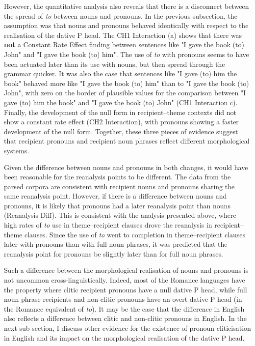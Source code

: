   However, the quantitative analysis also reveals that there is a disconnect between the spread of \textit{to} between nouns and pronouns. In the previous subsection, the assumption was that nouns and pronouns behaved identically with respect to the realisation of the dative P head. The CH1 Interaction (a) shows that there was \textbf{not} a Constant Rate Effect finding between sentences like "I gave the book (to) John" and "I gave the book (to) him". The use of \textit{to} with pronouns seems to have been actuated later than its use with nouns, but then spread through the grammar quicker. It was also the case that sentences like "I gave (to) him the book" behaved more like "I gave the book (to) him" than to "I gave the book (to) John", with zero on the border of plausible values for the comparison between "I gave (to) him the book" and "I gave the book (to) John" (CH1 Interaction c). Finally, the development of the null form in recipient--theme contexts did not show a constant rate effect (CH2 Interaction), with pronouns showing a faster development of the null form. Together, these three pieces of evidence suggest that recipient pronouns and recipient noun phrases reflect different morphological systems.

   Given the difference between nouns and pronouns in both changes, it would have been reasonable for the reanalysis points to be different. The data from the parsed corpora are consistent with recipient nouns and pronouns sharing the same reanalysis point. However, if there is a difference between nouns and pronouns, it is likely that pronouns had a later reanalysis point than nouns (Reanalysis Diff). This is consistent with the analysis presented above, where high rates of \textit{to} use in theme--recipient clauses drove the reanalysis in recipient--theme clauses. Since the use of \textit{to} went to completion in theme--recipient clauses later with pronouns than with full noun phrases, it was predicted that the reanalysis point for pronouns be slightly later than for full noun phrases.

   Such a difference between the morphological realisation of nouns and pronouns is not uncommon cross-linguistically. Indeed, most of the Romance languages have the property where clitic recipient pronouns have a null dative P head, while full noun phrase recipients and non-clitic pronouns have an overt dative P head (in the Romance equivalent of \textit{to}). It may be the case that the difference in English also reflects a difference between clitic and non-clitic pronouns in English. In the next sub-section, I discuss other evidence for the existence of pronoun cliticisation in English and its impact on the morphological realisation of the dative P head.
    
